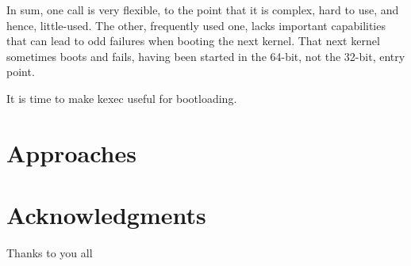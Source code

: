 \documentclass[fleqn,10pt]{olplainarticle}
\begin{document}
In sum, one call is very flexible, to the point that it is complex, hard to use, and hence, little-used. The other, frequently used one, lacks important capabilities that can lead to odd failures when booting the next kernel. That next kernel sometimes boots and fails, having been started in the 64-bit, not the 32-bit, entry point.

It is time to make kexec useful for bootloading. 

\section*{Approaches}

\section*{Acknowledgments}

Thanks to you all


\end{document}
